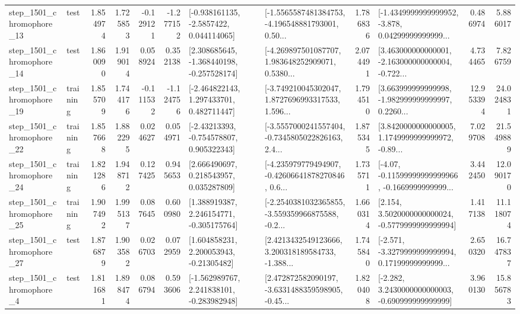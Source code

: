 \begin{tabular}{llrrrrllrlrr}
 step\_1501\_chromophore\_13 &      test &      1.854974 &    1.725853 &     -0.129121 & -1.277152 &     [-0.938161135, -2.5857422, 0.044114065] &  [-1.5565587481384753, -4.196548881793001, 0.50... &       1.786836 &  [-1.4349999999999952, -3.878, 0.04299999999999... &            0.486974 &          5.886017 \\
 step\_1501\_chromophore\_14 &      test &      1.860090 &    1.919014 &      0.058924 &  0.352138 &   [2.308685645, -1.368440198, -0.257528174] &  [-4.269897501087707, 1.983648252909071, 0.5380... &       2.074491 &  [3.463000000000001, -2.163000000000004, -0.722... &            4.734465 &          7.826759 \\
 step\_1501\_chromophore\_19 &  training &      1.855709 &    1.744176 &     -0.111532 & -1.124756 &    [-2.464822143, 1.297433701, 0.482711447] &  [-3.749210045302047, 1.8727696993317533, 1.596... &       1.794510 &  [3.663999999999998, -1.982999999999997, 0.2260... &           12.953394 &         24.024831 \\
 step\_1501\_chromophore\_22 &  training &      1.857668 &    1.882295 &      0.024627 &  0.054971 &    [-2.43213393, -0.754578807, 0.905322343] &  [-3.5557000241557404, -0.7345805022826163, 2.4... &       1.875345 &  [3.8420000000000005, 1.1749999999999972, -0.89... &            7.029708 &         21.549889 \\
 step\_1501\_chromophore\_24 &  training &      1.821286 &    1.948712 &      0.127425 &  0.945653 &     [2.666490697, 0.218543957, 0.035287809] &  [-4.235979779494907, -0.42606641878270846, 0.6... &       1.735711 &  [-4.07, -0.11599999999999966, -0.1669999999999... &            3.442450 &         12.090170 \\
 step\_1501\_chromophore\_25 &  training &      1.907492 &    1.995137 &      0.087645 &  0.600980 &    [1.388919387, 2.246154771, -0.305175764] &  [-2.2540381032365855, -3.559359966875588, -0.2... &       1.660314 &   [2.154, 3.5020000000000024, -0.5779999999999994] &            1.417138 &         11.118074 \\
 step\_1501\_chromophore\_27 &      test &      1.876879 &    1.903582 &      0.026703 &  0.072959 &     [1.604858231, 2.200053943, -0.21305482] &  [2.4213432549123666, 3.200318189584733, -1.388... &       1.745840 &  [-2.571, -3.3279999999999994, 0.17199999999999... &            2.650320 &         16.747837 \\
  step\_1501\_chromophore\_4 &      test &      1.811681 &    1.898474 &      0.086794 &  0.593606 &   [-1.562989767, 2.241838101, -0.283982948] &  [2.472872582090197, -3.6331488359598905, -0.45... &       1.820408 &   [-2.282, 3.2430000000000003, -0.690999999999999] &            3.960130 &         15.856783 \\

\end{tabular}
